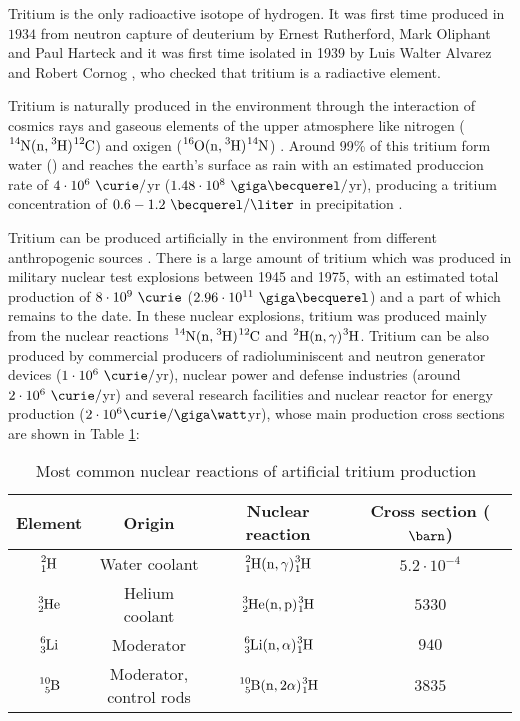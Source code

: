 Tritium is the only radioactive isotope of hydrogen. It was first time produced in $1934$ from neutron capture of deuterium by Ernest Rutherford, Mark Oliphant and Paul Harteck \cite{TritiumDiscovery} and it was first time isolated in 1939 by Luis Walter Alvarez and Robert Cornog \cite{TritiumIsolate}, who checked that tritium is a radiactive element. 

Tritium is naturally produced in the environment through the interaction of cosmics rays and gaseous elements of the upper atmosphere like nitrogen ($\ce{^{14}N}(\ce{n},\ce{^{3}H})\ce{^{12}C}$) \cite{TritiumHandling} and oxigen ($\ce{^{16}O}(\ce{n},\ce{^{3}H})\ce{^{14}N}$) \cite{OxigenTritium}. Around 99\% of this tritium form water () and reaches the earth's surface as rain with an estimated produccion rate of $4\cdot 10^6 ~\curie/$yr ($1.48 \cdot 10^8 ~\giga\becquerel/$yr), producing a tritium concentration of $0.6-1.2~\becquerel/\liter$ in precipitation \cite{CommonEmissionTritium, TritiumHandling}. 

Tritium can be produced artificially in the environment from different anthropogenic sources \cite{CommonEmissionTritium, TritiumHandling}. There is a large amount of tritium which was produced in military nuclear test explosions between 1945 and 1975, with an estimated total production of $8 \cdot 10^9~\curie$ ($2.96 \cdot 10^{11}~\giga\becquerel$) and a part of which remains to the date. In these nuclear explosions, tritium was produced mainly from the nuclear reactions $\ce{^{14}N}(\ce{n},\ce{^{3}H})\ce{^{12}C}$ and $\ce{^{2}H}(\ce{n},\gamma)\ce{^{3}H}$. Tritium can be also produced by commercial producers of radioluminiscent and neutron generator devices ($1 \cdot 10^6~\curie/$yr), nuclear power and defense industries (around $2 \cdot 10^6~\curie/$yr) and several research facilities and nuclear reactor for energy production ($2 \cdot 10^6 \curie/\giga\watt$yr), whose main production cross sections are shown in Table \ref{tab:NuclearReactionsTritiumProduction}: 

\begin{table}[htbp]
\begin{center}
\begin{tabular}{|c|c|c|c|}
\hline
Element & Origin & Nuclear reaction & Cross section ($\barn$)\\
\hline \hline \hline
$\ce{^{2}_{1}H}$ & Water coolant & $\ce{^{2}_{1}H}(\ce{n},\gamma)\ce{^{3}_{1}H}$ & $5.2 \cdot{} 10^{-4}$ \\ \hline
$\ce{^{3}_{2}He}$ & Helium coolant & $\ce{^{3}_{2}He}(\ce{n},\ce{p})\ce{^{3}_{1}H}$ & $5330$ \\ \hline
$\ce{^{6}_{3}Li}$ & Moderator & $\ce{^{6}_{3}Li}(\ce{n},\alpha)\ce{^{3}_{1}H}$ & $940$ \\ \hline
$\ce{^{10}_{5}B}$ & \parbox{8em}{\centering Moderator,\\ control rods} & $\ce{^{10}_{5}B}(\ce{n},2\alpha)\ce{^{3}_{1}H}$ & $3835$ \\ 
\hline
\end{tabular}
\caption{Most common nuclear reactions of artificial tritium production~\cite{CommonEmissionTritium}}
\label{tab:NuclearReactionsTritiumProduction}
\end{center}
\end{table}

